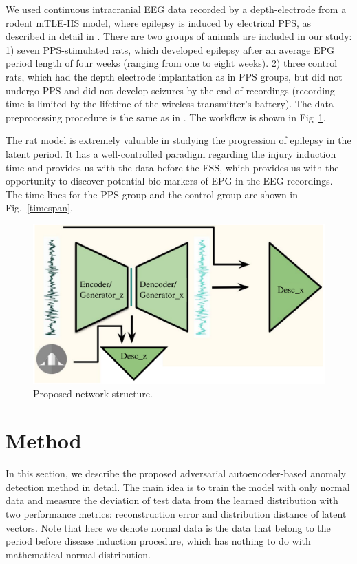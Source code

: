 \documentclass[pmlr]{jmlr}%
\begin{document}
We used continuous intracranial EEG data recorded by a depth-electrode from a rodent mTLE-HS model, where epilepsy is induced by electrical PPS, as described in detail in \cite{costard2019electrical}. There are two groups of animals are included in our study: 1) seven PPS-stimulated rats, which developed epilepsy after an average EPG period length of four weeks (ranging from one to eight weeks). 2) three control rats, which had the depth electrode implantation as in PPS groups, but did not undergo PPS and did not develop seizures by the end of recordings (recording time is limited by the lifetime of the wireless transmitter's battery). The data preprocessing procedure is the same as in \cite{lu2020towards}. The workflow is shown in Fig~\ref{workflow}. 

The rat model is extremely valuable in studying the progression of epilepsy in the latent period. It has a well-controlled paradigm regarding  the injury induction time and provides us with the data before the FSS, which provides us with the opportunity to discover potential bio-markers of EPG in the EEG recordings. The time-lines for the PPS group and the control group are shown in Fig.~\ref{timespan}. 



\begin{figure}[tb]
	\centering
	\includegraphics[width=0.9\linewidth]{figures/network_structure.pdf}
	\caption{Proposed network structure.}
	\label{workflow}
\end{figure}
\label{model}


\section{Method}
In this section, we describe the proposed adversarial autoencoder-based anomaly detection method in detail. The main idea is to train the model with only normal data and measure the deviation of test data from the learned distribution with two performance metrics: reconstruction error and distribution distance of latent vectors. Note that here we denote normal data is the data that belong to the period before disease induction procedure, which has nothing to do with mathematical normal distribution.
\end{document}
